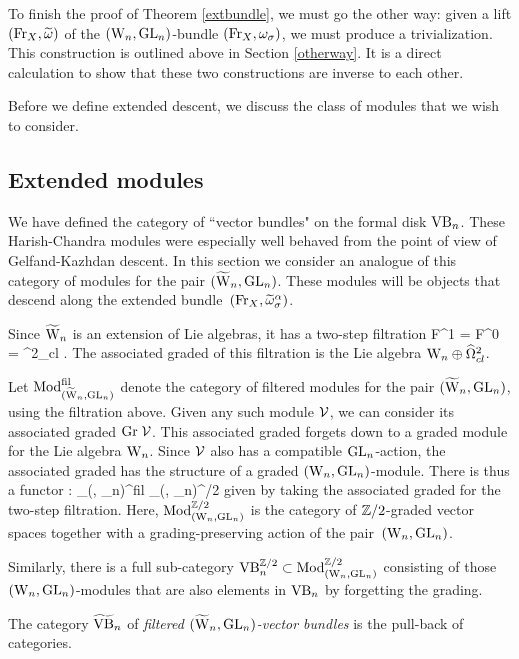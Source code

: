 To finish the proof of Theorem \ref{extbundle}, we must go the other way: 
given a lift $({\rm Fr}_X, \widetilde{\omega})$ of the $({{\rm W}_n}, {\rm GL}_n)$-bundle $({\rm Fr}_X, \omega_\sigma)$, 
we must produce a trivialization. 
This construction is outlined above in Section \ref{otherway}. 
It is a direct calculation to show that these two constructions are
inverse to each other. 

Before we define extended descent, we discuss the class of modules that we wish to consider.

\subsection{Extended modules}

We have defined the category of ``vector bundles" on the formal disk ${\rm VB}_n$. 
These Harish-Chandra modules were especially well behaved from the point of view of Gelfand-Kazhdan descent. 
In this section we consider an analogue of this category of modules for the pair $(\widetilde{{{\rm W}}}_n, {\rm GL}_n)$. 
These modules will be objects that descend along the extended bundle~$({\rm Fr}_X, \widetilde{\omega}^\alpha_{\sigma})$. 

Since $\widetilde{{{\rm W}}}_n$ is an extension of Lie algebras, 
it has a two-step filtration 
\ben
F^1 \TVect = \TVect \supset F^0 \TVect = \hOmega^2_{cl} .
\een 
The associated graded of this filtration is the Lie algebra ${{\rm W}_n}
\oplus \widehat{\Omega}^2_{cl}$. 

Let ${\rm Mod}_{(\widetilde{{{\rm W}}}_n, {\rm GL}_n)}^{\rm fil}$ denote the category of filtered modules for the pair $(\widetilde{{{\rm W}}}_n,{\rm GL}_n)$, 
using the filtration above. 
Given any such module $\mathcal{V}$, we can consider its associated graded ${\rm Gr} \; \mathcal{V}$. 
This associated graded forgets down to a graded module for the Lie algebra ${{\rm W}_n}$. 
Since $\mathcal{V}$ also has a compatible ${\rm GL}_n$-action,
the associated graded has the structure of a graded $({{\rm W}_n}, {\rm GL}_n)$-module. 
There is thus a functor 
\ben
\Gr: \Mod_{(\TVect, \GL_n)}^{\rm fil} \to \Mod_{(\Vect, \GL_n)}^{\ZZ/2}
\een
given by taking the associated graded for the two-step filtration. 
Here, ${\rm Mod}_{({{\rm W}_n}, {\rm GL}_n)}^{\mathbb Z/2}$ is the category of $\mathbb Z/2$-graded vector spaces 
together with a grading-preserving action of the pair~$({{\rm W}_n}, {\rm GL}_n)$. 

Similarly, there is a full sub-category ${\rm VB}_n^{\mathbb Z/2} \subset {\rm Mod}_{({{\rm W}_n}, {\rm GL}_n)}^{\mathbb Z/2}$ 
consisting of those $({{\rm W}_n},{\rm GL}_n)$-modules that are also elements in ${\rm VB}_n$ by forgetting the grading. 

\begin{dfn} 
The category $\widetilde{{\rm VB}}_n$ of {\em filtered $(\widetilde{{{\rm W}}}_n, {\rm GL}_n)$-vector bundles} 
is the pull-back
\ben
{}
\een 
of categories.
\end{dfn}

